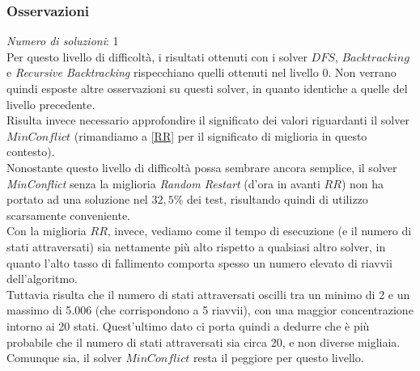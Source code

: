 \subsubsection{Osservazioni}

\textit{Numero di soluzioni}: 1\\

Per questo livello di difficoltà, i risultati ottenuti con i solver $DFS$, $Backtracking$ e \textit{Recursive Backtracking} rispecchiano quelli ottenuti nel livello 0. Non verrano quindi esposte altre osservazioni su questi solver, in quanto identiche a quelle del livello precedente.\\


Risulta invece necessario approfondire il significato dei valori riguardanti il solver $MinConflict$ (rimandiamo a \ref{RR} per il significato di miglioria in questo contesto).\\
Nonostante questo livello di difficoltà possa sembrare ancora semplice, il solver \textit{MinConflict} senza la miglioria \textit{Random Restart} (d'ora in avanti $RR$) non ha portato ad una soluzione nel $32,5\%$ dei test, risultando quindi di utilizzo scarsamente conveniente. \\
Con la miglioria $RR$, invece, vediamo come il tempo di esecuzione (e il numero di stati attraversati) sia nettamente più alto rispetto a qualsiasi altro solver, in quanto l'alto tasso di fallimento comporta spesso un numero elevato di riavvii dell'algoritmo. \\Tuttavia risulta che il numero di stati attraversati oscilli tra un minimo di 2 e un massimo di 5.006 (che corrispondono a 5 riavvii), con una maggior concentrazione intorno ai 20 stati. Quest'ultimo dato ci porta quindi a dedurre che è più probabile che il numero di stati attraversati sia circa 20, e non diverse migliaia.\\
Comunque sia, il solver $MinConflict$ resta il peggiore per questo livello.


